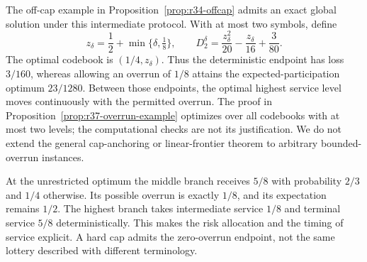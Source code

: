 The off-cap example in Proposition~\ref{prop:r34-offcap} admits an exact global solution under this intermediate protocol. With at most two symbols, define
\begin{equation}\label{eq:r37-risk-frontier}
 z_\delta=\frac12+\min\{\delta,\tfrac18\},\qquad
 D_2^\delta=\frac{z_\delta^2}{20}-\frac{z_\delta}{16}+\frac3{80}.
\end{equation}
The optimal codebook is $(1/4,z_\delta)$. Thus the deterministic endpoint has loss $3/160$, whereas allowing an overrun of $1/8$ attains the expected-participation optimum $23/1280$. Between those endpoints, the optimal highest service level moves continuously with the permitted overrun. The proof in Proposition~\ref{prop:r37-overrun-example} optimizes over all codebooks with at most two levels; the computational checks are not its justification. We do not extend the general cap-anchoring or linear-frontier theorem to arbitrary bounded-overrun instances.

At the unrestricted optimum the middle branch receives $5/8$ with probability $2/3$ and $1/4$ otherwise. Its possible overrun is exactly $1/8$, and its expectation remains $1/2$. The highest branch takes intermediate service $1/8$ and terminal service $5/8$ deterministically. This makes the risk allocation and the timing of service explicit. A hard cap admits the zero-overrun endpoint, not the same lottery described with different terminology.
